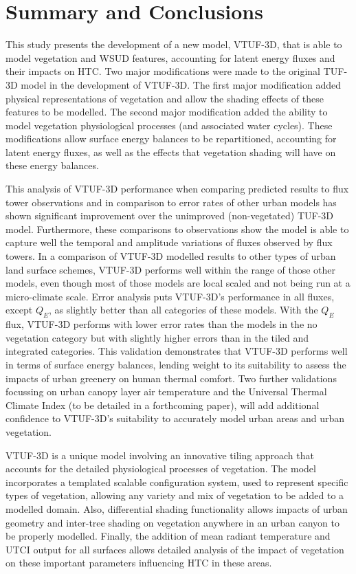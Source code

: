 \documentclass[final,3p,times,authoryear]{elsarticle}
\begin{document}
\section{Summary and Conclusions}

This study presents the development of a new model, VTUF-3D, that is able to model vegetation and WSUD features, accounting for latent energy fluxes and their impacts on HTC. Two major modifications were made to the original TUF-3D model in the development of VTUF-3D. The first major modification added physical representations of vegetation and allow the shading effects of these features to be modelled. The second major modification added the ability to model vegetation physiological processes (and associated water cycles). These modifications allow surface energy balances to be repartitioned, accounting for latent energy fluxes, as well as the effects that vegetation shading will have on these energy balances.

This analysis of VTUF-3D performance when comparing predicted results to flux tower observations and in comparison to error rates of other urban models has shown significant improvement over the unimproved (non-vegetated) TUF-3D model. Furthermore, these comparisons to observations show the model is able to capture well the temporal and amplitude variations of fluxes observed by flux towers. In a comparison of VTUF-3D modelled results to other types of urban land surface schemes, VTUF-3D performs well within the range of those other models, even though most of those models are local scaled and not being run at a micro-climate scale. Error analysis puts VTUF-3D's performance in all fluxes, except $Q_{E}$, as slightly better than all categories of these models. With the $Q_{E}$ flux, VTUF-3D performs with lower error rates than the models in the no vegetation category but with slightly higher errors than in the tiled and integrated categories. This validation demonstrates that VTUF-3D performs well in terms of surface energy balances, lending weight to its suitability to assess the impacts of urban greenery on human thermal comfort. Two further validations focussing on urban canopy layer air temperature and the Universal Thermal Climate Index (to be detailed in a forthcoming paper), will add additional confidence to VTUF-3D's suitability to accurately model urban areas and urban vegetation.

VTUF-3D is a unique model involving an innovative tiling approach that accounts for the detailed physiological processes of vegetation. The model incorporates a templated scalable configuration system, used to represent specific types of vegetation, allowing any variety and mix of vegetation to be added to a modelled domain. Also, differential shading functionality allows impacts of urban geometry and inter-tree shading on vegetation anywhere in an urban canyon to be properly modelled. Finally, the addition of mean radiant temperature and UTCI output for all surfaces allows detailed analysis of the impact of vegetation on these important parameters influencing HTC in these areas.
\end{document}
